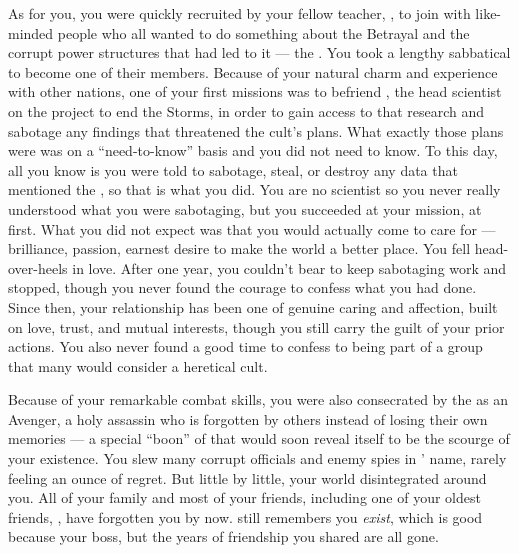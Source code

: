 \documentclass[char]{GL2020}
\begin{document}
As for you, you were quickly recruited by your fellow teacher, \cChupSecond{\full}, to join with like-minded people who all wanted to do something about the Betrayal and the corrupt power structures that had led to it — the \pGoaties{}. You took a lengthy sabbatical to become one of their members. Because of your natural charm and experience with other nations, one of your first missions was to befriend \cHeadScientist{\full}, the head scientist on the project to end the Storms, in order to gain access to that research and sabotage any findings that threatened the cult’s plans. What exactly those plans were was on a “need-to-know” basis and you did not need to know. To this day, all you know is you were told to sabotage, steal, or destroy any data that mentioned the \pSchool{}, so that is what you did. You are no scientist so you never really understood what you were sabotaging, but you succeeded at your mission, at first. What you did not expect was that you would actually come to care for \cHeadScientist{} — \cHeadScientist{\their} brilliance, \cHeadScientist{\their} passion, \cHeadScientist{\their} earnest desire to make the world a better place. You fell head-over-heels in love. After one year, you couldn't bear to keep sabotaging \cHeadScientist{\their} work and stopped, though you never found the courage to confess what you had done. Since then, your relationship has been one of genuine caring and affection, built on love, trust, and mutual interests, though you still carry the guilt of your prior actions. You also never found a good time to confess to being part of a group that many would consider a heretical cult.

Because of your remarkable combat skills, you were also consecrated by the \pGoaties{} as an Avenger, a holy assassin who is forgotten by others instead of losing their own memories — a special ``boon'' of \cGenesis{} that would soon reveal itself to be the scourge of your existence. You slew many corrupt officials and enemy spies in \cGenesis{}’ name, rarely feeling an ounce of regret. But little by little, your world disintegrated around you. All of your family and most of your friends, including one of your oldest friends, \cPrincipal{}, have forgotten you by now. \cPrincipal{} still remembers you \emph{exist}, which is good because \cPrincipal{\theyare} your boss, but the years of friendship you shared are all gone. 
\end{document}
